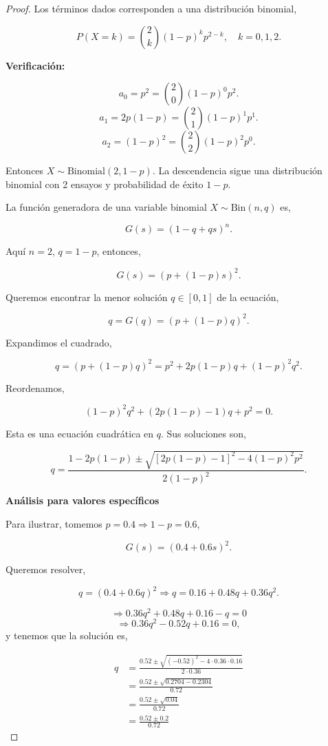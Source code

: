 \documentclass{article}
\begin{document}
\begin{proof}
Los términos dados corresponden a una distribución binomial,

\[
P(X = k) = \binom{2}{k} (1 - p)^k p^{2 - k}, \quad k = 0,1,2.
\]

\textbf{Verificación:}

\[
a_0 = p^2 = \binom{2}{0}(1 - p)^0 p^2.
\]
\[
a_1 = 2p(1 - p) = \binom{2}{1}(1 - p)^1 p^1.
\]
\[
a_2 = (1 - p)^2 = \binom{2}{2}(1 - p)^2 p^0.
\]

Entonces \( X \sim \text{Binomial}(2, 1 - p) \). La descendencia sigue una distribución binomial con 2 ensayos y probabilidad de éxito \( 1 - p \).

La función generadora de una variable binomial \( X \sim \text{Bin}(n, q) \) es,

\[
G(s) = (1 - q + qs)^n.
\]

Aquí \( n = 2 \), \( q = 1 - p \), entonces,

\[
G(s) = (p + (1 - p)s)^2.
\]

Queremos encontrar la menor solución \( q \in [0,1] \) de la ecuación,

\[
q = G(q) = (p + (1 - p)q)^2.
\]

Expandimos el cuadrado,

\[
q = (p + (1 - p)q)^2 = p^2 + 2p(1 - p)q + (1 - p)^2 q^2.
\]

Reordenamos,

\[
(1 - p)^2 q^2 + (2p(1 - p) - 1)q + p^2 = 0.
\]

Esta es una ecuación cuadrática en \( q \). Sus soluciones son,

\[
q = \frac{1 - 2p(1 - p) \pm \sqrt{[2p(1 - p) - 1]^2 - 4(1 - p)^2 p^2}}{2(1 - p)^2}.
\]

\textbf{Análisis para valores específicos}

Para ilustrar, tomemos \( p = 0.4 \Rightarrow 1 - p = 0.6 \),

\[
G(s) = (0.4 + 0.6s)^2.
\]

Queremos resolver,

\[
q = (0.4 + 0.6q)^2
\Rightarrow q = 0.16 + 0.48q + 0.36q^2.\]

\[\Rightarrow 0.36q^2 + 0.48q + 0.16 - q = 0\]
\[\Rightarrow 0.36q^2 - 0.52q + 0.16 = 0,
\]
y tenemos que la solución es,

\begin{align*}
q &= \frac{0.52 \pm \sqrt{(-0.52)^2 - 4 \cdot 0.36 \cdot 0.16}}{2 \cdot 0.36} \\
&= \frac{0.52 \pm \sqrt{0.2704 - 0.2304}}{0.72} \\
&= \frac{0.52 \pm \sqrt{0.04}}{0.72} \\
&= \frac{0.52 \pm 0.2}{0.72}
\end{align*}


\end{proof}
\end{document}
